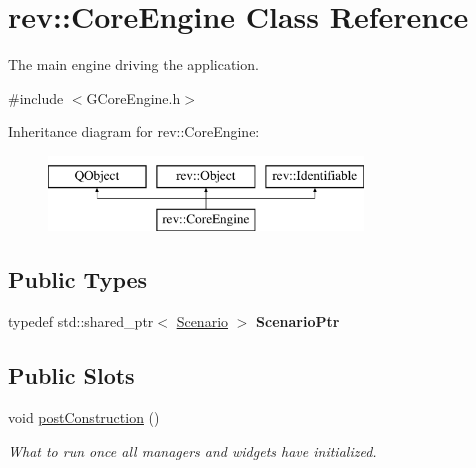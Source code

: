 \hypertarget{classrev_1_1_core_engine}{}\section{rev\+::Core\+Engine Class Reference}
\label{classrev_1_1_core_engine}


The main engine driving the application.  




{\ttfamily \#include $<$G\+Core\+Engine.\+h$>$}

Inheritance diagram for rev\+::Core\+Engine\+:\begin{figure}[H]
\begin{center}
\leavevmode
\includegraphics[height=2.000000cm]{classrev_1_1_core_engine}
\end{center}
\end{figure}
\subsection*{Public Types}
\begin{DoxyCompactItemize}
\item 
\mbox{\label{classrev_1_1_core_engine_a4d0415e755c0f019be6388302c82ccb0}} 
typedef std\+::shared\+\_\+ptr$<$ \mbox{\hyperlink{classrev_1_1_scenario}{Scenario}} $>$ {\bfseries Scenario\+Ptr}
\end{DoxyCompactItemize}
\subsection*{Public Slots}
\begin{DoxyCompactItemize}
\item 
\mbox{\label{classrev_1_1_core_engine_ae00b97315f9fa1d71c0e04802b229155}} 
void \mbox{\hyperlink{classrev_1_1_core_engine_ae00b97315f9fa1d71c0e04802b229155}{post\+Construction}} ()
\begin{DoxyCompactList}\small\item\em What to run once all managers and widgets have initialized. \end{DoxyCompactList}\end{DoxyCompactItemize}
